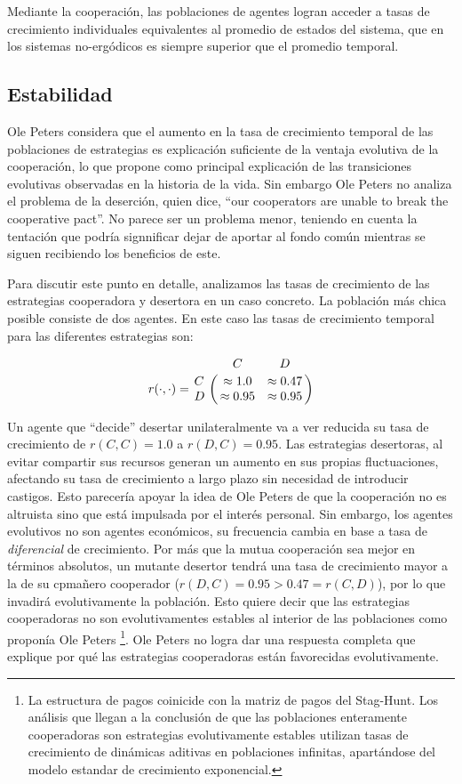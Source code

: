 \documentclass[a4paper,10pt]{article}
\begin{document}
Mediante la cooperación, las poblaciones de agentes logran acceder a tasas de crecimiento individuales equivalentes al promedio de estados del sistema, que en los sistemas no-ergódicos es siempre superior que el promedio temporal.

\subsection{Estabilidad}

Ole Peters considera que el aumento en la tasa de crecimiento temporal de las poblaciones de estrategias es explicación suficiente de la ventaja evolutiva de la cooperación, lo que propone como principal explicación de las transiciones evolutivas observadas en la historia de la vida.
Sin embargo Ole Peters no analiza el problema de la deserción, quien dice, ``our cooperators are unable to break the cooperative pact''.
No parece ser un problema menor, teniendo en cuenta la tentación que podría signnificar dejar de aportar al fondo común mientras se siguen recibiendo los beneficios de este.

Para discutir este punto en detalle, analizamos las tasas de crecimiento de las estrategias cooperadora y desertora en un caso concreto.
La población más chica posible consiste de dos agentes.
En este caso las tasas de crecimiento temporal para las diferentes estrategias son:

\begin{equation}
   r(\cdot,\cdot) = \bordermatrix{ & C & D \cr
      C & \approx 1.0 & \approx 0.47 \cr
      D & \approx 0.95 & \approx 0.95 } 
\end{equation}

Un agente que ``decide'' desertar unilateralmente va a ver reducida su tasa de crecimiento de $r(C,C) = 1.0$ a $ r(D,C) = 0.95$.
Las estrategias desertoras, al evitar compartir sus recursos generan un aumento en sus propias fluctuaciones, afectando su tasa de crecimiento a largo plazo sin necesidad de introducir castigos.
Esto parecería apoyar la idea de Ole Peters de que la cooperación no es altruista sino que está impulsada por el interés personal.
Sin embargo, los agentes evolutivos no son agentes económicos, su frecuencia cambia en base a tasa de \emph{diferencial} de crecimiento.
Por más que la mutua cooperación sea mejor en términos absolutos, un mutante desertor tendrá una tasa de crecimiento mayor a la de su cpmañero cooperador ($r(D,C) = 0.95 > 0.47 = r(C,D)$), por lo que invadirá evolutivamente la población. 
Esto quiere decir que las estrategias cooperadoras no son evolutivamentes estables al interior de las poblaciones como proponía Ole Peters \footnote{La estructura de pagos coinicide con la matriz de pagos del Stag-Hunt. Los análisis que llegan a la conclusión de que las poblaciones enteramente cooperadoras son estrategias evolutivamente estables utilizan tasas de crecimiento de dinámicas aditivas en poblaciones infinitas, apartándose del modelo estandar de crecimiento exponencial.}.
Ole Peters no logra dar una respuesta completa que explique por qué las estrategias cooperadoras están favorecidas evolutivamente.
\end{document}
